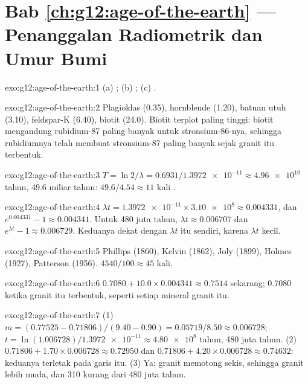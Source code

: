 \section*{Bab \ref{ch:g12:age-of-the-earth} --- Penanggalan Radiometrik dan Umur Bumi}

\begin{solution}{exo:g12:age-of-the-earth:1}
(a) ; (b) ; (c) .
\end{solution}

\begin{solution}{exo:g12:age-of-the-earth:2}
Plagioklas (0.35), hornblende (1.20), batuan utuh (3.10), feldspar-K (6.40),
biotit (24.0). Biotit terplot paling tinggi: biotit mengandung rubidium-87
paling banyak untuk stronsium-86-nya, sehingga rubidiumnya telah membuat
stronsium-87 paling banyak sejak granit itu terbentuk.
\end{solution}

\begin{solution}{exo:g12:age-of-the-earth:3}
$T = \ln 2/\lambda = 0.6931/\num{1.3972e-11} \approx \num{4.96e10}$ tahun,
49.6 miliar tahun: $49.6/4.54 \approx 11$ kali .
\end{solution}

\begin{solution}{exo:g12:age-of-the-earth:4}
$\lambda t = \num{1.3972e-11} \times \num{3.10e8} \approx 0.004331$, dan
$e^{0.004331} - 1 \approx 0.004341$. Untuk 480 juta tahun, $\lambda t
\approx 0.006707$ dan $e^{\lambda t} - 1 \approx 0.006729$. Keduanya dekat
dengan $\lambda t$ itu sendiri, karena $\lambda t$ kecil.
\end{solution}

\begin{solution}{exo:g12:age-of-the-earth:5}
Phillips (1860), Kelvin (1862), Joly (1899), Holmes (1927), Patterson
(1956). $4540/100 \approx 45$ kali.
\end{solution}

\begin{solution}{exo:g12:age-of-the-earth:6}
$0.7080 + 10.0 \times 0.004341 \approx 0.7514$ sekarang; 0.7080 ketika granit
itu terbentuk, seperti setiap mineral granit itu.
\end{solution}

\begin{solution}{exo:g12:age-of-the-earth:7}
(1) $m = (0.77525 - 0.71806)/(9.40 - 0.90) = 0.05719/8.50 \approx 0.006728$;
$t = \ln(1.006728)/\num{1.3972e-11} \approx \num{4.80e8}$ tahun, 480 juta
tahun. (2) $0.71806 + 1.70 \times 0.006728 \approx 0.72950$ dan $0.71806 + 4.20
\times 0.006728 \approx 0.74632$: keduanya terletak pada garis itu. (3) Ya:
granit memotong sekis, sehingga granit lebih muda, dan 310 kurang dari 480 juta
tahun.
\end{solution}

